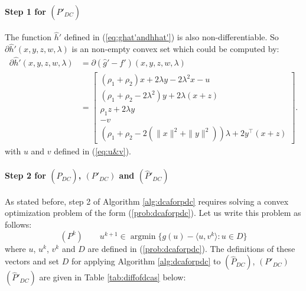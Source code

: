 \documentclass[3p]{elsarticle}
\DeclareMathOperator{\argmin}{argmin}
\begin{document}
\paragraph{\textbf{Step 1 for $(\hat{P}'_{DC})$}}  The function $\hat{h}'$ defined in (\ref{eq:ghat'andhhat'}) is also  non-differentiable. So $\partial \hat{h}'(x,y,z,w,\lambda)$ is an non-empty convex set which could be computed by:
\begin{equation}\label{eq:dhhat'}
\begin{array}{rl}
\partial \hat{h}'(x,y,z,w,\lambda)  & = \partial (\hat{g}' - f') (x,y,z,w,\lambda)\\
&=\begin{bmatrix}
(\rho_1+\rho_2)x + 2\lambda y - 2\lambda^2 x - u \\
(\rho_1+\rho_2-2\lambda^2)y + 2\lambda(x+z) \\
\rho_1z + 2\lambda y \\
-v \\
(\rho_1+\rho_2-2(\|x\|^2+\|y\|^2))\lambda + 2y^{\top}(x+z)
\end{bmatrix}.
\end{array}
\end{equation}
with $u$ and $v$ defined in (\ref{eq:u&v}).
\paragraph{\textbf{Step 2 for $(\hat{P}_{DC})$, $(P'_{DC})$ and $(\hat{P}'_{DC})$}} As stated before, step 2 of Algorithm \ref{alg:dcaforpdc} requires solving a convex optimization problem of the form (\ref{prob:dcaforpdc}). Let us write this problem as follows: \begin{equation}
\nonumber (P^k)\qquad u^{k+1}\in \argmin\{g(u)-\langle u,v^k\rangle: u\in D\}
\end{equation}
where $u$, $u^k$, $v^k$ and $D$ are defined in (\ref{prob:dcaforpdc}).
The definitions of these vectors and set $D$ for applying Algorithm \ref{alg:dcaforpdc} to $(\hat{P}_{DC})$, $(P'_{DC})$ $(\hat{P}'_{DC})$ are given in Table \ref{tab:diffofdcas} below:
\end{document}
